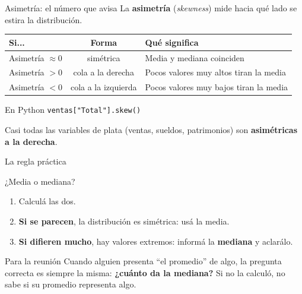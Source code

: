 \documentclass[aspectratio=169,10pt]{beamer}
\begin{document}
\begin{frame}{Asimetría: el número que avisa}
  La \textbf{asimetría} (\emph{skewness}) mide hacia qué lado se estira la distribución.

  \vspace{0.5em}
  \begin{center}
  \begin{tabular}{lcl}
    \toprule
    \textbf{Si...} & \textbf{Forma} & \textbf{Qué significa} \\
    \midrule
    Asimetría $\approx 0$   & simétrica       & Media y mediana coinciden \\
    Asimetría $> 0$         & cola a la derecha & Pocos valores muy altos tiran la media \\
    Asimetría $< 0$         & cola a la izquierda & Pocos valores muy bajos tiran la media \\
    \bottomrule
  \end{tabular}
  \end{center}

  \vspace{0.6em}
  \begin{exampleblock}{En Python}
    \texttt{ventas["Total"].skew()}
  \end{exampleblock}

  \begin{center}
  \small Casi todas las variables de plata (ventas, sueldos, patrimonios) son \textbf{asimétricas a la derecha}.
  \end{center}
\end{frame}

\begin{frame}{La regla práctica}
  \begin{block}{¿Media o mediana?}
    \begin{enumerate}
      \item Calculá las dos.
      \item \textbf{Si se parecen}, la distribución es simétrica: usá la media.
      \item \textbf{Si difieren mucho}, hay valores extremos: informá la \textbf{mediana}
            y aclarálo.
    \end{enumerate}
  \end{block}
  \vspace{0.4em}
  \begin{alertblock}{Para la reunión}
    Cuando alguien presenta ``el promedio'' de algo, la pregunta correcta es siempre la misma:
    \textbf{¿cuánto da la mediana?} Si no la calculó, no sabe si su promedio representa algo.
  \end{alertblock}
\end{frame}
\end{document}
